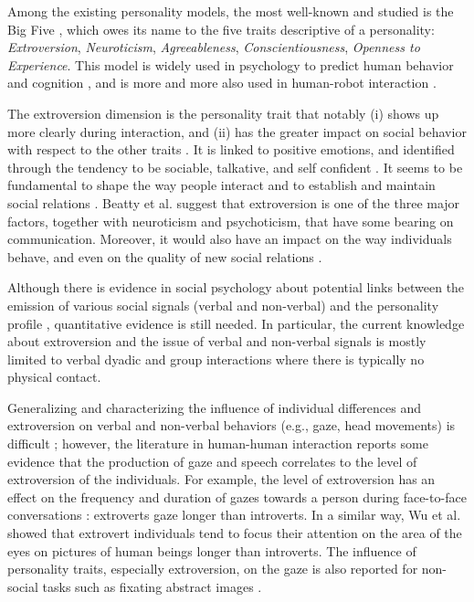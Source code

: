Among the existing personality models, the most well-known and studied is the Big Five \cite{NEOPIR1998}, which owes its name to the five traits descriptive of a personality: \emph{Extroversion}, \emph{Neuroticism}, \emph{Agreeableness}, \emph{Conscientiousness}, \emph{Openness to Experience}. This model is widely used in psychology to predict human behavior and cognition \cite{Wu2014,Rauthmann2012}, and is more and more also used in human-robot interaction \cite{Tapus08,Takayama2009proxemics}.


The extroversion dimension is the personality trait that notably (i) shows up more clearly during interaction, and (ii) has the greater impact on social behavior with respect to the other traits \cite{Zen2010}. It is linked to positive emotions, and identified through the tendency to be sociable, talkative, and self confident \cite{NEOPIR1998}. 
It seems to be fundamental to shape the way people interact \cite{Eysenck1981} and to establish and maintain social relations \cite{Wu2014}.
Beatty et al. \cite{Beatty2001} suggest that extroversion is one of the three major factors, together with neuroticism and psychoticism, that have some bearing on communication.  Moreover, it would also have an impact on the way individuals behave, and even on the quality of new social relations \cite{Berry2000}.

Although there is evidence in social psychology about potential links between the emission of various social signals (verbal and non-verbal) and the personality profile \cite{Argyle1976}, quantitative evidence is still needed. 
In particular, the current knowledge about extroversion and the issue of verbal and non-verbal signals is mostly limited to verbal dyadic and group interactions where there is typically no physical contact. 

Generalizing and characterizing the influence of individual differences and extroversion on verbal and non-verbal behaviors (e.g., gaze, head movements) is difficult \cite{LaFrance2004}; however, the literature in human-human interaction reports some evidence that the production of gaze and speech correlates to the level of extroversion of the individuals. 
For example, the level of extroversion has an effect on the frequency and duration of gazes towards a person during face-to-face conversations \cite{Iizuka1992}: extroverts gaze longer than introverts.
In a similar way, Wu et al. \cite{Wu2014} showed that extrovert individuals tend to focus their attention on the area of the eyes on pictures of human beings longer than introverts. 
The influence of personality traits, especially extroversion, on the gaze is also reported for non-social tasks such as fixating abstract images \cite{Rauthmann2012}. 

